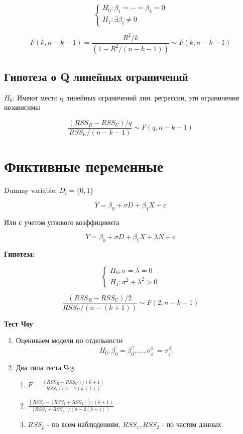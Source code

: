 \documentclass[a4paper, 12pt]{article}
\begin{document}
\[
\begin{cases}
    H_0: \beta_1 = \cdots = \beta_k = 0 \\
    H_1: \exists \beta_i \neq 0    
\end{cases}
\]

\[F(k, n - k - 1) = \frac{R^2 / k}{(1 - R^2 / (n - k - 1))} \sim F(k, n - k - 1)\]

\begin{center}
\end{center}

\subsection{Гипотеза о Q линейных ограничений}

$H_0$: Имеют место q линейных ограничений лин. регрессии, 
эти ограничения независимы

\[\frac{(RSS_R - RSS_U) / q}{RSS_U / (n - k - 1)} \sim F(q, n - k - 1)\]

\section{Фиктивные переменные}

Dummy variable: $D_i = \{0, 1\}$

\[Y = \beta_0 + \sigma D + \beta_1 X + \varepsilon\]

Или с учетом углового коэффициента

\[Y = \beta_0 + \sigma D + \beta_1 X + \lambda N + \varepsilon\]

\textbf{Гипотеза:}

\[
\begin{cases}
    H_0: \sigma = \lambda = 0 \\
    H_1: \sigma^2 + \lambda^2 > 0
\end{cases}
\]

\[\frac{(RSS_R - RSS_U) / 2}{RSS_U / (n - (k + 1))} \sim F(2, n - k - 1)\]

\textbf{Тест Чоу}

\begin{enumerate}
    \item Оцениваем модели по отдельности
    \[
        H_0: \beta^{\prime}_0 = \beta^{\prime \prime}_0, \ldots, \sigma^2_{\varepsilon^{\prime}} = \sigma^2_{\varepsilon^{\prime\prime}}
    \]
    \item Два типа теста Чоу
    \begin{enumerate}
        \item $F = \frac{(RSS_R - RSS_U) / (k + 1)}{RSS_U / (n - 2(k + 1))}$
        \item $\frac{(RSS_p - \left[RSS_1 + RSS_2\right]) / (k + 1)}
        {\left[RSS_1 + RSS_2\right] / (n - 2(k + 1))}$
        \item $RSS_p$ - по всем наблюдениям, $RSS_1, RSS_2$ - по частям данных
    \end{enumerate}
\end{enumerate}
\end{document}
